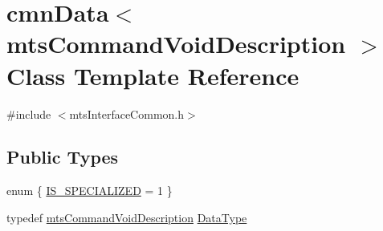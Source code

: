 \hypertarget{classcmn_data_3_01mts_command_void_description_01_4}{\section{cmn\-Data$<$ mts\-Command\-Void\-Description $>$ Class Template Reference}
\label{classcmn_data_3_01mts_command_void_description_01_4}
}


{\ttfamily \#include $<$mts\-Interface\-Common.\-h$>$}

\subsection*{Public Types}
\begin{DoxyCompactItemize}
\item 
enum \{ \hyperlink{classcmn_data_3_01mts_command_void_description_01_4_a3f5385c0e470876d1a86ffcb8c5a23b1a6179e63fede915ad2b315314584f25f0}{I\-S\-\_\-\-S\-P\-E\-C\-I\-A\-L\-I\-Z\-E\-D} = 1
 \}
\item 
typedef \hyperlink{classmts_command_void_description}{mts\-Command\-Void\-Description} \hyperlink{classcmn_data_3_01mts_command_void_description_01_4_a3e577a0f1b624d67c004609f2145eba4}{Data\-Type}
\end{DoxyCompactItemize}
